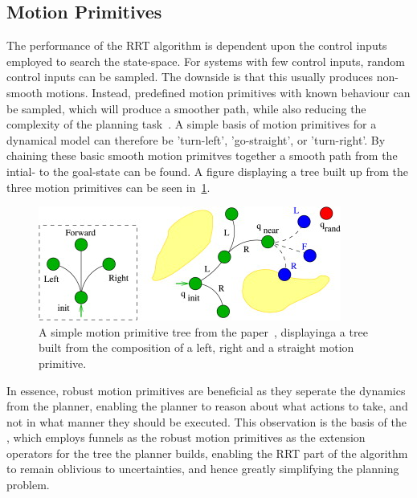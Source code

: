 \subsection{Motion Primitives}

The performance of the \ac{RRT} algorithm is dependent upon the control inputs
employed to search the state-space. For systems with few control inputs, random
control inputs can be sampled. The downside is that this usually produces
non-smooth motions. Instead, predefined motion primitives with known behaviour
can be sampled, which will produce a smoother path, while also reducing the
complexity of the planning
task~\cite{vonasekGlobalMotionPlanning2013,hauserUsingMotionPrimitives2008}. A
simple basis of motion primitives for a dynamical model can therefore be
'turn-left', 'go-straight', or 'turn-right'. By chaining these basic smooth
motion primitves together a smooth path from the intial- to the goal-state can
be found. A figure displaying a tree built up from the three motion primitives
can be seen in~\cref{fig:motion-primitive-tree}.

\begin{figure}
  \centering
  \includegraphics[scale=1]{figures/preliminaries/motion-primitive-tree}
  \caption{A simple motion primitive tree from the
    paper~\cite{vonasekHighlevelMotionPlanning2015}, displayinga a tree built
    from the composition of a left, right and a straight motion primitive.}
  \label{fig:motion-primitive-tree}
\end{figure}

In essence, robust motion primitives are beneficial as they seperate the
dynamics from the planner, enabling the planner to reason about what actions to
take, and not in what manner they should be executed. This observation is the
basis of the \rrtfunnel{}, which employs funnels as the robust motion primitives
as the extension operators for the tree the planner builds, enabling the
\ac{RRT} part of the \rrtfunnel{} algorithm to remain oblivious to
uncertainties, and hence greatly simplifying the planning problem.

